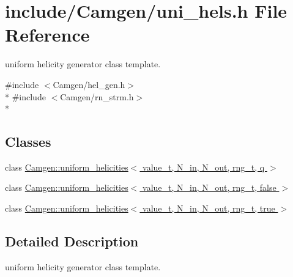 \hypertarget{a00820}{}\section{include/\+Camgen/uni\+\_\+hels.h File Reference}
\label{a00820}


uniform helicity generator class template.  


{\ttfamily \#include $<$Camgen/hel\+\_\+gen.\+h$>$}\\*
{\ttfamily \#include $<$Camgen/rn\+\_\+strm.\+h$>$}\\*
\subsection*{Classes}
\begin{DoxyCompactItemize}
\item 
class \hyperlink{a00561}{Camgen\+::uniform\+\_\+helicities$<$ value\+\_\+t, N\+\_\+in, N\+\_\+out, rng\+\_\+t, q $>$}
\item 
class \hyperlink{a00562}{Camgen\+::uniform\+\_\+helicities$<$ value\+\_\+t, N\+\_\+in, N\+\_\+out, rng\+\_\+t, false $>$}
\item 
class \hyperlink{a00563}{Camgen\+::uniform\+\_\+helicities$<$ value\+\_\+t, N\+\_\+in, N\+\_\+out, rng\+\_\+t, true $>$}
\end{DoxyCompactItemize}


\subsection{Detailed Description}
uniform helicity generator class template. 

